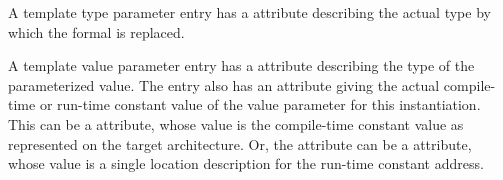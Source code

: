 A
template type parameter entry has a
\DWATtype{} attribute
describing the actual type by which the formal is replaced.


A template value parameter entry has a \DWATtype{} attribute 
describing the type of the parameterized value.
The entry also has an attribute giving the 
actual compile-time or run-time constant value 
of the value parameter for this instantiation.
This can be a \DWATconstvalue{} attribute, whose
value is the compile-time constant value as represented 
on the target architecture. 
Or, the attribute can be a \DWATlocation{} attribute, whose value is a 
single location description for the run-time constant address.

